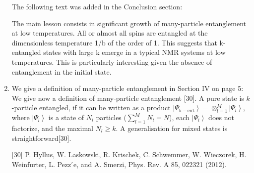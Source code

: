 \begin{enumerate}
The following text was added in the Conclusion section:

The main lesson consists in significant growth of many-particle entanglement at low temperatures. 
All or almost all spins are entangled at the dimensionless temperature 1/b of the order of 1. 
This suggests that k-entangled states with large k emerge in a typical NMR systems at low temperatures. 
This is particularly interesting given the absence of entanglement in the initial state.

\item We give a definition of many-particle entanglement in Section IV on page 5:
We give now a definition of many-particle entanglement [30]. 
A pure state is $k$-particle entangled, if it can be written as a product \mbox{$\left| \Psi_\mathrm{k-ent} \right\rangle = \otimes^M_{l=1} \left| \Psi_l \right\rangle$}, where $\left| \Psi_l \right\rangle$ is a state of $N_l$ particles \mbox{($\sum\limits_{l=1}^M N_l = N$)}, each  $\left| \Psi_l \right\rangle$ does not factorize, and the maximal $N_l \geq k$. A generalisation for mixed states is straightforward[30].

[30] P. Hyllus, W. Laskowski, R. Krischek, C. Schwemmer,
W. Wieczorek, H. Weinfurter, L. Pezz ́e, and A. Smerzi, Phys. Rev. A 85, 022321 (2012).
\end{enumerate}



	